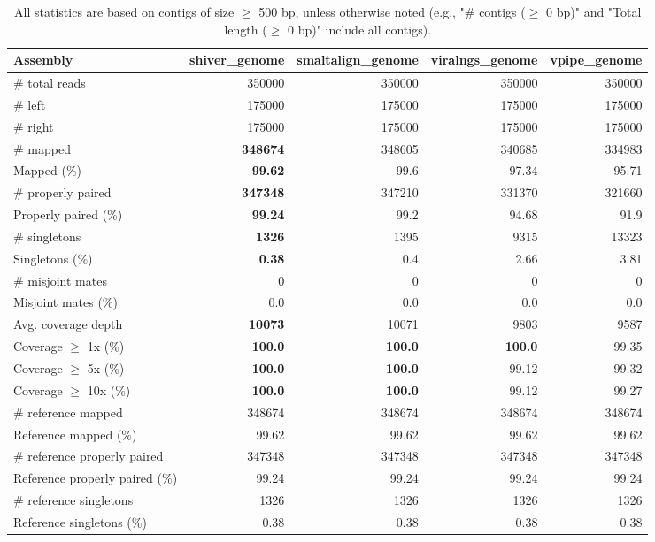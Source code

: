 \documentclass[12pt,a4paper]{article}
\begin{document}
\begin{table}[ht]
\begin{center}
\caption{All statistics are based on contigs of size $\geq$ 500 bp, unless otherwise noted (e.g., "\# contigs ($\geq$ 0 bp)" and "Total length ($\geq$ 0 bp)" include all contigs).}
\begin{tabular}{|l*{4}{|r}|}
\hline
Assembly & shiver\_genome & smaltalign\_genome & viralngs\_genome & vpipe\_genome \\ \hline
\# total reads & 350000 & 350000 & 350000 & 350000 \\ \hline
\# left & 175000 & 175000 & 175000 & 175000 \\ \hline
\# right & 175000 & 175000 & 175000 & 175000 \\ \hline
\# mapped & {\bf 348674} & 348605 & 340685 & 334983 \\ \hline
Mapped (\%) & {\bf 99.62} & 99.6 & 97.34 & 95.71 \\ \hline
\# properly paired & {\bf 347348} & 347210 & 331370 & 321660 \\ \hline
Properly paired (\%) & {\bf 99.24} & 99.2 & 94.68 & 91.9 \\ \hline
\# singletons & {\bf 1326} & 1395 & 9315 & 13323 \\ \hline
Singletons (\%) & {\bf 0.38} & 0.4 & 2.66 & 3.81 \\ \hline
\# misjoint mates & 0 & 0 & 0 & 0 \\ \hline
Misjoint mates (\%) & 0.0 & 0.0 & 0.0 & 0.0 \\ \hline
Avg. coverage depth & {\bf 10073} & 10071 & 9803 & 9587 \\ \hline
Coverage $\geq$ 1x (\%) & {\bf 100.0} & {\bf 100.0} & {\bf 100.0} & 99.35 \\ \hline
Coverage $\geq$ 5x (\%) & {\bf 100.0} & {\bf 100.0} & 99.12 & 99.32 \\ \hline
Coverage $\geq$ 10x (\%) & {\bf 100.0} & {\bf 100.0} & 99.12 & 99.27 \\ \hline
\# reference mapped & 348674 & 348674 & 348674 & 348674 \\ \hline
Reference mapped (\%) & 99.62 & 99.62 & 99.62 & 99.62 \\ \hline
\# reference properly paired & 347348 & 347348 & 347348 & 347348 \\ \hline
Reference properly paired (\%) & 99.24 & 99.24 & 99.24 & 99.24 \\ \hline
\# reference singletons & 1326 & 1326 & 1326 & 1326 \\ \hline
Reference singletons (\%) & 0.38 & 0.38 & 0.38 & 0.38 \\ \hline

\end{tabular}
\end{center}
\end{table}
\end{document}
